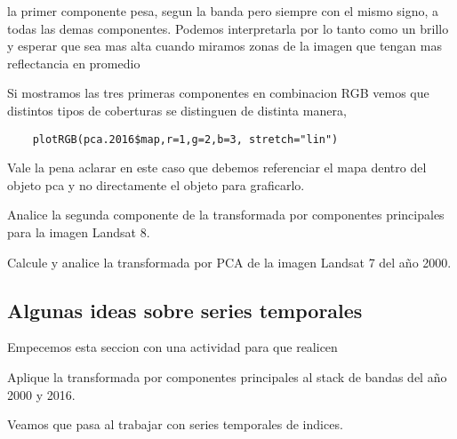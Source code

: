\begin{exa}
    la primer componente pesa, segun la banda pero siempre con el mismo signo, a
    todas las demas componentes. Podemos interpretarla por lo tanto como un
    brillo y esperar que sea mas alta cuando miramos  zonas de la imagen que
    tengan mas reflectancia en promedio

    Si mostramos las tres primeras componentes en combinacion RGB vemos que
    distintos tipos de coberturas se distinguen de distinta manera,

    \begin{lstlisting}
    plotRGB(pca.2016$map,r=1,g=2,b=3, stretch="lin")
    \end{lstlisting}

    Vale la pena aclarar en este caso que debemos referenciar el mapa dentro del
    objeto pca y no directamente el objeto para graficarlo.
\end{exa}

\begin{act}
    Analice la segunda componente de la transformada por componentes principales
    para la imagen Landsat 8.
\end{act}

\begin{act}
    Calcule y analice la transformada por PCA de la imagen Landsat 7 del año
    2000.
\end{act}

\subsection{Algunas ideas sobre series temporales}

Empecemos esta seccion con una actividad para que realicen

\begin{act}
    Aplique la transformada por componentes principales al stack de bandas del
    año 2000 y 2016.
\end{act}

Veamos que pasa al trabajar con series temporales de indices.


